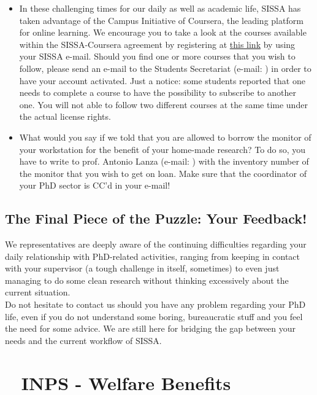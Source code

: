 \documentclass{sissavademecum}
\begin{document}
\begin{itemize}
	\item In these challenging times for our daily as well as academic life, SISSA has taken advantage of the Campus Initiative of Coursera, the leading platform for online learning. We encourage you to take a look at the courses available within the SISSA-Coursera agreement by registering at \href{https://www.coursera.org/programs/sissa-on-coursera-dkw8c}{this link} by using your SISSA e-mail. Should you find one or more courses that you wish to follow, please send an e-mail to the Students Secretariat (e-mail: ) in order to have your account activated. Just a notice: some students reported that one needs to complete a course to have the possibility to subscribe to another one. You will not able to follow two different courses at the same time under the actual license rights.
	
	\item What would you say if we told that you are allowed to borrow the monitor of your workstation for the benefit of your home-made research? To do so, you have to write to prof. Antonio Lanza (e-mail: ) with the inventory number of the monitor that you wish to get on loan. Make sure that the coordinator of your PhD sector is CC'd in your e-mail!
\end{itemize}


\section{The Final Piece of the Puzzle: Your Feedback!}

We representatives are deeply aware of the continuing difficulties regarding your daily relationship with PhD-related activities, ranging from keeping in contact with your supervisor (a tough challenge in itself, sometimes) to even just managing to do some clean research without thinking excessively about the current situation. \\
Do not hesitate to contact us should you have any problem regarding your PhD life, even if you do not understand some boring, bureaucratic stuff and you feel the need for some advice. We are still here for bridging the gap between your needs and the current workflow of SISSA.



\chapter{\texorpdfstring{\faFileInvoiceDollar\ }{} INPS - Welfare Benefits}
\label{sec:gestione_separata_inps}
\end{document}
